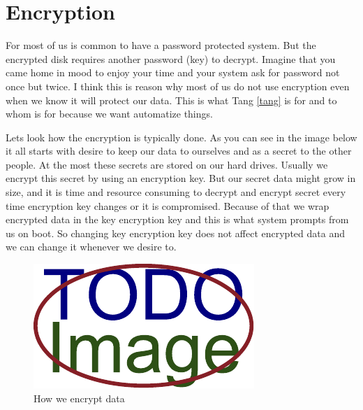 \documentclass[../xdudla00-porting-Tang-to-Open-WRT.tex]{subfiles}
\begin{document}
\chapter{Encryption}\label{encryption}

For most of us is common to have a password protected system.
But the encrypted disk requires another password (key) to decrypt.
Imagine that you came home in mood to enjoy your time and your system ask for password not once but twice.
I think this is reason why most of us do not use encryption even when we know it will protect our data.
This is what Tang \ref{tang} is for and to whom is for because we want automatize things.

Lets look how the encryption is typically done. As you can see in the image below it all starts with desire to keep our data to ourselves and as a secret to the other people.
At the most these secrets are stored on our hard drives. Usually we encrypt this secret by using an encryption key.
But our secret data might grow in size, and it is time and resource consuming to decrypt and encrypt secret every time encryption key changes or it is compromised.
Because of that we wrap encrypted data in the key encryption key and this is what system prompts from us on boot.
So changing key encryption key does not affect encrypted data and we can change it whenever we desire to.

\begin{figure}[h]
    \centering
    \includegraphics{../figures/placeholder.pdf}
    \caption{How we encrypt data}
    \label{fig:encdata}
\end{figure}

\end{document}
